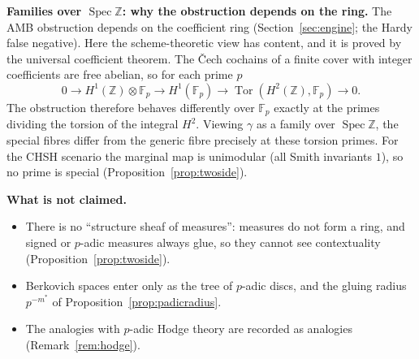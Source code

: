 \documentclass[11pt]{article}
\theoremstyle{definition}
\theoremstyle{remark}
\newcommand{\Z}{\mathbb{Z}}
\newcommand{\F}{\mathbb{F}}
\begin{document}
\textbf{Families over $\operatorname{Spec}\Z$: why the obstruction depends on the ring.} The AMB obstruction depends on the coefficient ring (Section~\ref{sec:engine}; the Hardy false negative). Here the scheme-theoretic view has content, and it is proved by the universal coefficient theorem. The \v{C}ech cochains of a finite cover with integer coefficients are free abelian, so for each prime $p$
\[
0\to H^1(\Z)\otimes\F_p\to H^1(\F_p)\to\operatorname{Tor}(H^2(\Z),\F_p)\to0 .
\]
The obstruction therefore behaves differently over $\F_p$ exactly at the primes dividing the torsion of the integral $H^2$. Viewing $\gamma$ as a family over $\operatorname{Spec}\Z$, the special fibres differ from the generic fibre precisely at these torsion primes. For the CHSH scenario the marginal map is unimodular (all Smith invariants $1$), so no prime is special (Proposition~\ref{prop:twoside}).

\textbf{What is not claimed.}
\begin{itemize}
  \item There is no ``structure sheaf of measures'': measures do not form a ring, and signed or $p$-adic measures always glue, so they cannot see contextuality (Proposition~\ref{prop:twoside}).
  \item Berkovich spaces enter only as the tree of $p$-adic discs, and the gluing radius $p^{-m^*}$ of Proposition~\ref{prop:padicradius}.
  \item The analogies with $p$-adic Hodge theory are recorded as analogies (Remark~\ref{rem:hodge}).
\end{itemize}
\end{document}
